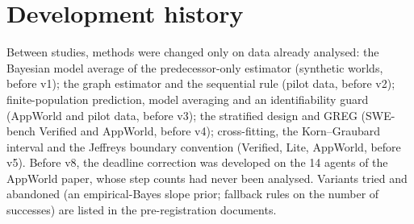 \documentclass[11pt]{article}
\begin{document}



\appendix
\section{Development history}
Between studies, methods were changed only on data already analysed: the Bayesian model average of the
predecessor-only estimator (synthetic worlds, before v1); the graph estimator and the sequential rule (pilot data,
before v2); finite-population prediction, model averaging and an identifiability guard (AppWorld and pilot data,
before v3); the stratified design and GREG (SWE-bench Verified and AppWorld, before v4); cross-fitting, the
Korn--Graubard interval and the Jeffreys boundary convention (Verified, Lite, AppWorld, before v5). Before v8, the deadline correction was developed on the 14 agents of the AppWorld paper, whose step counts had never been analysed. Variants tried and
abandoned (an empirical-Bayes slope prior; fallback rules on the number of successes) are listed in the
pre-registration documents.

\clearpage
\end{document}
